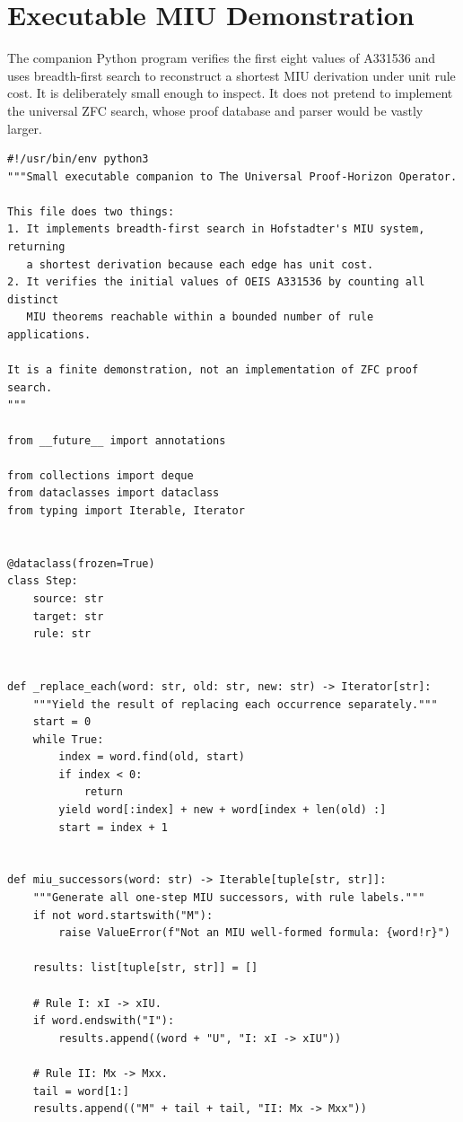 \documentclass[11pt,oneside]{book}
\theoremstyle{definition}
\theoremstyle{remark}
\begin{document}
\appendix
\chapter{Executable MIU Demonstration}
The companion Python program verifies the first eight values of A331536 and uses breadth-first search to reconstruct a shortest MIU derivation under unit rule cost. It is deliberately small enough to inspect. It does not pretend to implement the universal ZFC search, whose proof database and parser would be vastly larger.

\begin{lstlisting}[style=pythonstyle]
#!/usr/bin/env python3
"""Small executable companion to The Universal Proof-Horizon Operator.

This file does two things:
1. It implements breadth-first search in Hofstadter's MIU system, returning
   a shortest derivation because each edge has unit cost.
2. It verifies the initial values of OEIS A331536 by counting all distinct
   MIU theorems reachable within a bounded number of rule applications.

It is a finite demonstration, not an implementation of ZFC proof search.
"""

from __future__ import annotations

from collections import deque
from dataclasses import dataclass
from typing import Iterable, Iterator


@dataclass(frozen=True)
class Step:
    source: str
    target: str
    rule: str


def _replace_each(word: str, old: str, new: str) -> Iterator[str]:
    """Yield the result of replacing each occurrence separately."""
    start = 0
    while True:
        index = word.find(old, start)
        if index < 0:
            return
        yield word[:index] + new + word[index + len(old) :]
        start = index + 1


def miu_successors(word: str) -> Iterable[tuple[str, str]]:
    """Generate all one-step MIU successors, with rule labels."""
    if not word.startswith("M"):
        raise ValueError(f"Not an MIU well-formed formula: {word!r}")

    results: list[tuple[str, str]] = []

    # Rule I: xI -> xIU.
    if word.endswith("I"):
        results.append((word + "U", "I: xI -> xIU"))

    # Rule II: Mx -> Mxx.
    tail = word[1:]
    results.append(("M" + tail + tail, "II: Mx -> Mxx"))


\end{lstlisting}
\end{document}
